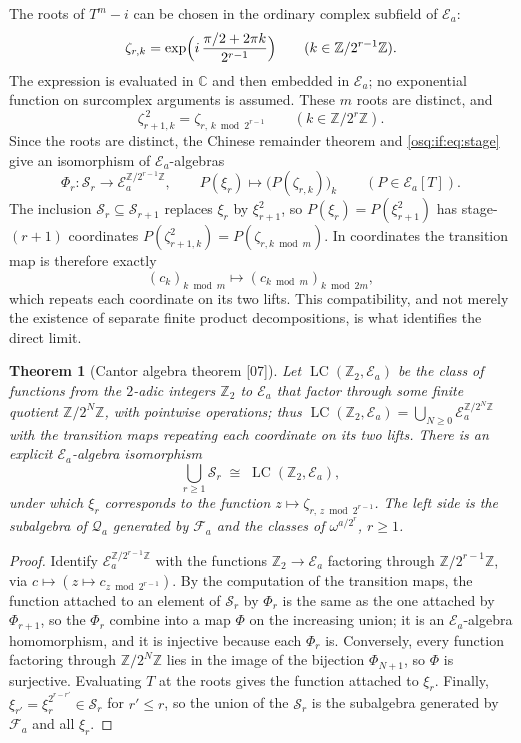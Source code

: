 \documentclass[11pt,letterpaper]{article}
\numberwithin{equation}{section}
\newtheorem{theorem}{Theorem}[section]
\theoremstyle{definition}
\theoremstyle{remark}
\theoremstyle{plain}
\newcommand{\Z}{\mathbb Z}
\newcommand{\C}{\mathbb C}
\newcommand{\FF}{\mathscr F}         %
\newcommand{\EE}{\mathscr E}         %
\newcommand{\Qa}{\mathcal Q}         %
\newcommand{\LC}{\operatorname{LC}}
\newcommand{\src}[1]{\textup{\textsf{[#1]}}}
\begin{document}
The roots of $T^m-i$ can be chosen in the ordinary complex subfield of $\EE_a$:
\begin{equation}\label{osq:if:eq:zetas}
 \zeta_{r,k}=\exp\Bigl(i\,\frac{\pi/2+2\pi k}{2^{r-1}}\Bigr)\qquad(k\in\Z/2^{r-1}\Z).
\end{equation}
The expression is evaluated in $\C$ and then embedded in $\EE_a$; no exponential function
on surcomplex arguments is assumed. These $m$ roots are distinct, and
\[
 \zeta_{r+1,k}^{\,2}=\zeta_{r,\,k\bmod 2^{r-1}}\qquad(k\in\Z/2^r\Z).
\]
Since the roots are distinct, the Chinese remainder theorem and \eqref{osq:if:eq:stage}
give an isomorphism of $\EE_a$-algebras
\begin{equation}\label{osq:if:eq:stageCRT}
 \Phi_r:\mathcal S_r\longrightarrow\EE_a^{\Z/2^{r-1}\Z},\qquad
 P(\xi_r)\longmapsto\bigl(P(\zeta_{r,k})\bigr)_k\qquad(P\in\EE_a[T]).
\end{equation}
The inclusion $\mathcal S_r\subseteq\mathcal S_{r+1}$ replaces $\xi_r$ by $\xi_{r+1}^2$, so
$P(\xi_r)=P(\xi_{r+1}^2)$ has stage-$(r+1)$ coordinates
$P(\zeta_{r+1,k}^2)=P(\zeta_{r,k\bmod m})$. In coordinates the transition map is therefore
exactly
\[
 (c_k)_{k\bmod m}\longmapsto(c_{k\bmod m})_{k\bmod 2m},
\]
which repeats each coordinate on its two lifts. This compatibility, and not merely the
existence of separate finite product decompositions, is what identifies the direct limit.

\begin{theorem}[Cantor algebra theorem \src{07}]\label{osq:if:thm:cantor}
Let $\LC(\Z_2,\EE_a)$ be the class of functions from the $2$-adic integers $\Z_2$ to $\EE_a$
that factor through some finite quotient $\Z/2^N\Z$, with pointwise operations; thus
$\LC(\Z_2,\EE_a)=\bigcup_{N\ge0}\EE_a^{\Z/2^N\Z}$ with the transition maps repeating each
coordinate on its two lifts. There is an explicit $\EE_a$-algebra isomorphism
\begin{equation}\label{osq:if:eq:cantor}
 \bigcup_{r\ge1}\mathcal S_r\;\cong\;\LC(\Z_2,\EE_a),
\end{equation}
under which $\xi_r$ corresponds to the function $z\mapsto\zeta_{r,\,z\bmod 2^{r-1}}$. The
left side is the subalgebra of $\Qa_a$ generated by $\FF_a$ and the classes of
$\omega^{a/2^r}$, $r\ge1$.
\end{theorem}

\begin{proof}
Identify $\EE_a^{\Z/2^{r-1}\Z}$ with the functions $\Z_2\to\EE_a$ factoring through
$\Z/2^{r-1}\Z$, via $c\mapsto(z\mapsto c_{z\bmod 2^{r-1}})$. By the computation of the
transition maps, the function attached to an element of $\mathcal S_r$ by $\Phi_r$ is the
same as the one attached by $\Phi_{r+1}$, so the $\Phi_r$ combine into a map $\Phi$ on the
increasing union; it is an $\EE_a$-algebra homomorphism, and it is injective because each
$\Phi_r$ is. Conversely, every function factoring through $\Z/2^N\Z$ lies in the image of
the bijection $\Phi_{N+1}$, so $\Phi$ is surjective. Evaluating $T$ at the roots gives the
function attached to $\xi_r$. Finally, $\xi_{r'}=\xi_r^{2^{r-r'}}\in\mathcal S_r$ for
$r'\le r$, so the union of the $\mathcal S_r$ is the subalgebra generated by $\FF_a$ and all
$\xi_r$.
\end{proof}
\end{document}

